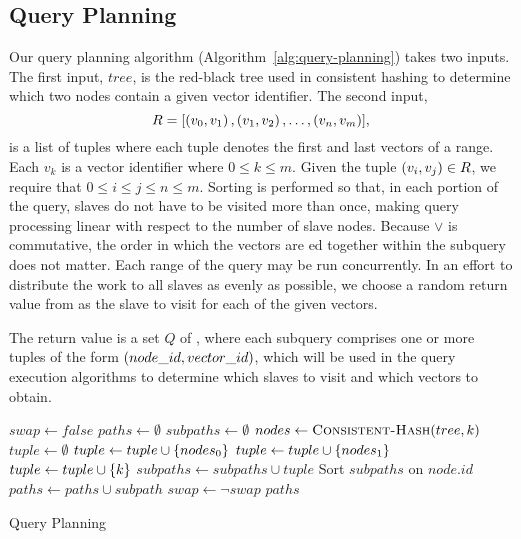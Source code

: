 \subsection{Query Planning}
Our query planning algorithm (Algorithm~\ref{alg:query-planning}) takes two
inputs. The first input, \(tree\), is the red-black tree used in consistent
hashing to determine which two nodes contain a given vector identifier.
The second input,
\[R = [\left(v_0, v_1\right), \left(v_1, v_2\right), \ldots, \left(v_n, v_m\right)],\]
is a list of tuples where each tuple denotes the first and last vectors of a
range. Each \(v_k\) is a vector identifier where \(0 \leq k \leq m\). Given the
tuple \(\left(v_i, v_j\right) \in R\), we require that
\(0 \leq i \leq j \leq n \leq m\). Sorting is performed so that, in each
portion of the query, slaves do not have to be visited more than once, making
query processing linear with respect to the number of slave nodes. Because
\(\lor\) is commutative, the order in which the vectors are ed
together within the subquery does not matter. Each range of the query may be
run concurrently. In an effort to distribute the work to all slaves as evenly
as possible, we choose a random return value from 
as the slave to visit for each of the given vectors.
\par
The return value is a set \(Q\) of , where each subquery
comprises one or more tuples of the form \(\left(node\_id,vector\_id\right)\),
which will be used in the query execution algorithms to determine which slaves
to visit and which vectors to obtain.
%
\begin{algorithm}
    \begin{algorithmic}
            \State $swap \gets false$
            \State $paths \gets \emptyset$
                \State $subpaths \gets \emptyset$
                    \State $nodes \gets \Call{Consistent-Hash}{tree, k}$
                    \State $tuple \gets \emptyset$
                        \State $tuple \gets tuple \cup \left\{nodes_0\right\}$
                    \Else
                        \State $tuple \gets tuple \cup \left\{nodes_1\right\}$
                    \EndIf
                    \State $tuple \gets tuple \cup \left\{k\right\}$
                    \State $subpaths \gets subpaths \cup tuple$
                \EndFor
                \State Sort $subpaths$ on $node.id$
                \State $paths \gets paths \cup subpath$
                \State $swap \gets \neg swap$
            \EndFor
            \Return $paths$
        \EndProcedure
    \end{algorithmic}
    \caption{Query Planning}
    \label{alg:query-planning}
\end{algorithm}
%
